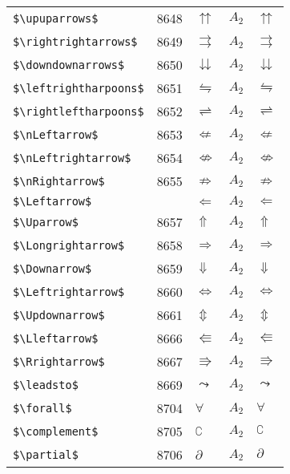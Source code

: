 \documentclass{article}
\begin{document}
\begin{table}
\begin{center}
\begin{tabular}{llll}
 \verb#$\upuparrows$#          & 8648    & $\upuparrows$          & $A_2\quad \upuparrows$\\
 \verb#$\rightrightarrows$#    & 8649    & $\rightrightarrows$    & $A_2\quad \rightrightarrows$\\
 \verb#$\downdownarrows$#      & 8650    & $\downdownarrows$      & $A_2\quad \downdownarrows$\\
 \verb#$\leftrightharpoons$#   & 8651    & $\leftrightharpoons$   & $A_2\quad \leftrightharpoons$\\
 \verb#$\rightleftharpoons$#   & 8652    & $\rightleftharpoons$   & $A_2\quad \rightleftharpoons$\\
 \verb#$\nLeftarrow$#          & 8653    & $\nLeftarrow$          & $A_2\quad \nLeftarrow$\\
 \verb#$\nLeftrightarrow$#     & 8654    & $\nLeftrightarrow$     & $A_2\quad \nLeftrightarrow$\\
 \verb#$\nRightarrow$#         & 8655    & $\nRightarrow$         & $A_2\quad \nRightarrow$\\
 \verb#$\Leftarrow$#           &         & $\Leftarrow$           & $A_2\quad \Leftarrow$\\
 \verb#$\Uparrow$#             & 8657    & $\Uparrow$             & $A_2\quad \Uparrow$\\
 \verb#$\Longrightarrow$#      & 8658    & $\Longrightarrow$      & $A_2\quad \Longrightarrow$\\
 \verb#$\Downarrow$#           & 8659    & $\Downarrow$           & $A_2\quad \Downarrow$\\
 \verb#$\Leftrightarrow$#      & 8660    & $\Leftrightarrow$      & $A_2\quad \Leftrightarrow$\\
 \verb#$\Updownarrow$#         & 8661    & $\Updownarrow$         & $A_2\quad \Updownarrow$\\
 \verb#$\Lleftarrow$#          & 8666    & $\Lleftarrow$          & $A_2\quad \Lleftarrow$\\
 \verb#$\Rrightarrow$#         & 8667    & $\Rrightarrow$         & $A_2\quad \Rrightarrow$\\
 \verb#$\leadsto$#             & 8669    & $\leadsto$             & $A_2\quad \leadsto$\\
 \verb#$\forall$#              & 8704    & $\forall$              & $A_2\quad \forall$\\
 \verb#$\complement$#          & 8705    & $\complement$          & $A_2\quad \complement$\\
 \verb#$\partial$#             & 8706    & $\partial$             & $A_2\quad \partial$\\

\end{tabular}
\end{center}
\end{table}
\end{document}
